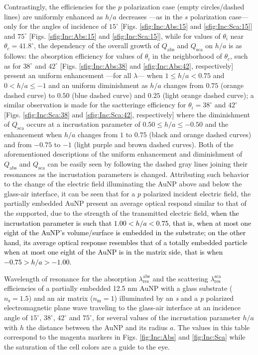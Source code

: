 Contrastingly, the efficiencies for the $p$ polarization case (empty circles/dashed lines) are uniformly enhanced as $h/a$ decreases ---as in the $s$ polarization case--- only for the angles of incidence of $15^\circ$ [Figs. \ref{sfig:Inc:Abs:15} and \ref{sfig:Inc:Sca:15}] and $75^\circ$ [Figs. \ref{sfig:Inc:Abs:15} and \ref{sfig:Inc:Sca:15}], while for values of $\theta_i$ near $\theta_c = 41.8^\circ$, the dependency of the overall growth of $Q_\text{abs}$ and $Q_\text{sca}$ on $h/a$ is as follows: the absorption efficiency for values of $\theta_i $ in the neighborhood of $\theta_c$, such as for $38^\circ$ and $42^\circ$ [Figs. \ref{sfig:Inc:Abs:38} and \ref{sfig:Inc:Abs:42}, respectively] present an uniform enhancement ---for all $\lambda$--- when $1 \leq h/a < 0.75$ and $0< h/a \leq -1$ and an uniform diminishment as $h/a$ changes from $0.75$ (orange dashed curve) to $0.50$  (blue dashed curve)  and $0.25$  (light orange dashed curve); a similar observation is made for the sactteringe efficiency for $\theta_i = 38 ^\circ$ and $42 ^\circ$   [Figs. \ref{sfig:Inc:Sca:38} and \ref{sfig:Inc:Sca:42}, respectively] where the diminishment of $Q_\text{sca}$ occurs at a incrustation parameter of $0.50 \leq h/a \leq -0.50$ and the enhancement when $h/a$ changes from $1$ to $0.75$ (black and orange dashed curves) and from $-0.75$ to $-1$  (light purple and brown dashed curves). Both of the aforementioned descriptions of the uniform enhancement and diminishment of $Q_\text{abs}$ and $Q_\text{sca}$ can be easily seen by following the dashed gray lines joining their resonances as the incrustation parameters is changed. Attributing such behavior to the change of the electric field illuminating the AuNP above and below the glass-air interface, it can be seen that for a $p$ polarized incident electric field, the partially embedded AuNP present an average optical respond similar to that of the supported, due to the strength of the transmitted electric field,  \textcolor{black}{when the incrustation parameter is such that $1.00<h/a<0.75$, that is, when at most one eight of the AuNP's volume/surface is embedded in the substrate; on the other hand, its average optical response resembles that of a totally embedded particle when at most one eight of the AuNP is in the matrix side, that is when  $-0.75>h/a>-1.00$.}

\begin{table}[b!]\footnotesize\centering
    \caption{Wavelength of resonance for the absorption $\lambda_\text{res}^\text{abs}$ and the scattering $\lambda_\text{res}^\text{sca}$ efficiencies of a partially embedded 12.5 nm AuNP with a glass substrate ($n_\text{s} = 1.5$) and an air matrix ($n_\text{m} = 1$)    illuminated by an \textit{s} and a \textit{p} polarized electromagnetic plane wave traveling to the glass-air interface at an incidence angle of $15^\circ$,  $38^\circ$,  $42^\circ$ and  $75^\circ$, for several values of the incrustation parameter $h/a$ with $h$ the distance between the AuNP and its radius $a$. The values in this table correspond to the magenta markers in Figs. \ref{fig:Inc:Abs} and \ref{fig:Inc:Sca} while the saturation of the cell colors are a guide to the eye.}
    \label{tab:Resonances}
    
\end{table}

